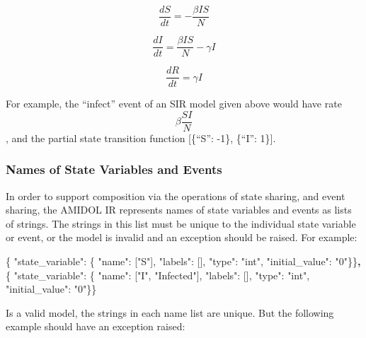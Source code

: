 \documentclass[]{article}
\newenvironment{Shaded}{}{}
\newcommand{\DataTypeTok}[1]{\textcolor[rgb]{0.56,0.13,0.00}{#1}}
\newcommand{\StringTok}[1]{\textcolor[rgb]{0.25,0.44,0.63}{#1}}
\newcommand{\OtherTok}[1]{\textcolor[rgb]{0.00,0.44,0.13}{#1}}
\newcommand{\FunctionTok}[1]{\textcolor[rgb]{0.02,0.16,0.49}{#1}}
\newcommand{\ErrorTok}[1]{\textcolor[rgb]{1.00,0.00,0.00}{\textbf{#1}}}
\begin{document}
\[ \frac{dS}{dt} = -\frac{\beta IS}{N} \]

\[ \frac{dI}{dt} = \frac{\beta IS}{N} - \gamma I \]

\[ \frac{dR}{dt} = \gamma I \]

For example, the ``infect'' event of an SIR model given above would have
rate \[\beta \frac{SI}{N}\], and the partial state transition function
{[}\{``S'': -1\}, \{``I'': 1\}{]}.

\subsubsection{Names of State Variables and
Events}\label{names-of-state-variables-and-events}

In order to support composition via the operations of state sharing, and
event sharing, the AMIDOL IR represents names of state variables and
events as lists of strings. The strings in this list must be unique to
the individual state variable or event, or the model is invalid and an
exception should be raised. For example:

\begin{Shaded}
\begin{Highlighting}[]
\FunctionTok{\{} \DataTypeTok{"state_variable"}\FunctionTok{:} \FunctionTok{\{} \DataTypeTok{"name"}\FunctionTok{:} \OtherTok{[}\StringTok{"S"}\OtherTok{]}\FunctionTok{,} \DataTypeTok{"labels"}\FunctionTok{:} \OtherTok{[]}\FunctionTok{,} \DataTypeTok{"type"}\FunctionTok{:} \StringTok{"int"}\FunctionTok{,}
    \DataTypeTok{"initial_value"}\FunctionTok{:} \StringTok{"0"}\FunctionTok{\}\}}\ErrorTok{,}
\FunctionTok{\{} \DataTypeTok{"state_variable"}\FunctionTok{:} \FunctionTok{\{} \DataTypeTok{"name"}\FunctionTok{:} \OtherTok{[}\StringTok{"I"}\OtherTok{,} \StringTok{"Infected"}\OtherTok{]}\FunctionTok{,} \DataTypeTok{"labels"}\FunctionTok{:} \OtherTok{[]}\FunctionTok{,} \DataTypeTok{"type"}\FunctionTok{:} \StringTok{"int"}\FunctionTok{,}
    \DataTypeTok{"initial_value"}\FunctionTok{:} \StringTok{"0"}\FunctionTok{\}\}}
\end{Highlighting}
\end{Shaded}

Is a valid model, the strings in each name list are unique. But the
following example should have an exception raised:
\end{document}
